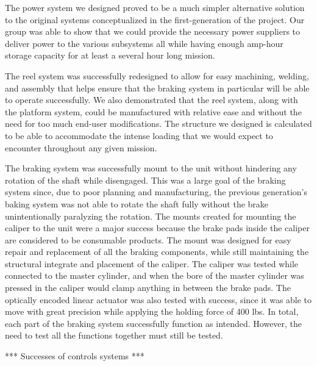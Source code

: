 The power system we designed proved to be a much simpler alternative solution to the original systems conceptualized in the first-generation of the project. Our group was able to show that we could provide the necessary power suppliers to deliver power to the various subsystems all while having enough amp-hour storage capacity for at least a several hour long mission. 

The reel system was successfully redesigned to allow for easy machining, welding, and assembly that helps ensure that the braking system in particular will be able to operate successfully. We also demonstrated that the reel system, along with the platform system, could be manufactured with relative ease and without the need for too much end-user modifications. The structure we designed is calculated to be able to accommodate the intense loading that we would expect to encounter throughout any given mission. 

The braking system was successfully mount to the unit without hindering any rotation of the shaft while disengaged. This was a large goal of the braking system since, due to poor planning and manufacturing, the previous generation's baking system was not able to rotate the shaft fully without the brake unintentionally paralyzing the rotation. The mounts created for mounting the caliper to the unit were a major success because the brake pads inside the caliper are considered to be consumable products. The mount was designed for easy repair and replacement of all the braking components, while still maintaining the structural integrate and placement of the caliper. The caliper was tested while connected to the master cylinder, and when the bore of the master cylinder was pressed in the caliper would clamp anything in between the brake pads. The optically encoded linear actuator was also tested with success, since it was able to move with great precision while applying the holding force of 400 lbs. In total, each part of the braking system successfully function as intended. However, the need to test all the functions together must still be tested.

*** Successes of controls systems ***

